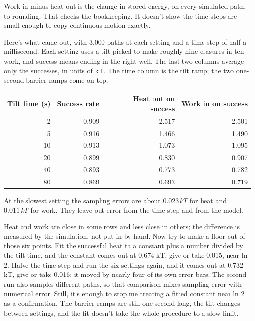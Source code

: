 \documentclass[11pt,twoside]{article}
\theoremstyle{thielethm}
\theoremstyle{thieledef}
\theoremstyle{thieledef}
\theoremstyle{thieledef}
\theoremstyle{thielethm}
\theoremstyle{thieleobs}
\theoremstyle{thielethm}
\begin{document}
Work in minus heat out is the change in stored energy, on every simulated path, to rounding. That checks the bookkeeping. It doesn't show the time steps are small enough to copy continuous motion exactly.

Here's what came out, with 3,000 paths at each setting and a time step of half a millisecond. Each setting uses a tilt picked to make roughly nine erasures in ten work, and success means ending in the right well. The last two columns average only the successes, in units of kT. The time column is the tilt ramp; the two one-second barrier ramps come on top.

\begin{center}\small
\begin{tabular}{rrrr}
\toprule
Tilt time (s) & Success rate & Heat out on success & Work in on success\\
\midrule
2  & 0.909 & 2.517 & 2.501\\
5  & 0.916 & 1.466 & 1.490\\
10 & 0.913 & 1.073 & 1.095\\
20 & 0.899 & 0.830 & 0.907\\
40 & 0.893 & 0.773 & 0.782\\
80 & 0.869 & 0.693 & 0.719\\
\bottomrule
\end{tabular}

\footnotesize At the slowest setting the sampling errors are about $0.023\,kT$ for heat and
$0.011\,kT$ for work. They leave out error from the time step and from the model.
\end{center}

Heat and work are close in some rows and less close in others; the difference is measured by the simulation, not put in by hand. Now try to make a floor out of those six points. Fit the successful heat to a constant plus a number divided by the tilt time, and the constant comes out at 0.674 kT, give or take 0.015, near ln 2. Halve the time step and run the six settings again, and it comes out at 0.732 kT, give or take 0.016: it moved by nearly four of its own error bars. The second run also samples different paths, so that comparison mixes sampling error with numerical error. Still, it's enough to stop me treating a fitted constant near ln 2 as a confirmation. The barrier ramps are still one second long, the tilt changes between settings, and the fit doesn't take the whole procedure to a slow limit.
\end{document}
